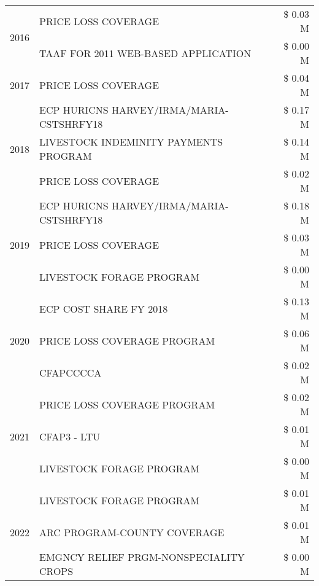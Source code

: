 \begin{tabular}{llr}
\multirow[t]{2}{*}{2016} & PRICE LOSS COVERAGE & \$ 0.03 M \\
 & TAAF FOR 2011 WEB-BASED APPLICATION & \$ 0.00 M \\
\cline{1-3}
2017 & PRICE LOSS COVERAGE & \$ 0.04 M \\
\cline{1-3}
\multirow[t]{3}{*}{2018} & ECP HURICNS HARVEY/IRMA/MARIA-CSTSHRFY18 & \$ 0.17 M \\
 & LIVESTOCK INDEMINITY PAYMENTS PROGRAM & \$ 0.14 M \\
 & PRICE LOSS COVERAGE & \$ 0.02 M \\
\cline{1-3}
\multirow[t]{3}{*}{2019} & ECP HURICNS HARVEY/IRMA/MARIA-CSTSHRFY18 & \$ 0.18 M \\
 & PRICE LOSS COVERAGE & \$ 0.03 M \\
 & LIVESTOCK FORAGE PROGRAM & \$ 0.00 M \\
\cline{1-3}
\multirow[t]{3}{*}{2020} & ECP COST SHARE FY 2018 & \$ 0.13 M \\
 & PRICE LOSS COVERAGE PROGRAM & \$ 0.06 M \\
 & CFAPCCCCA & \$ 0.02 M \\
\cline{1-3}
\multirow[t]{3}{*}{2021} & PRICE LOSS COVERAGE PROGRAM & \$ 0.02 M \\
 & CFAP3 - LTU & \$ 0.01 M \\
 & LIVESTOCK FORAGE PROGRAM & \$ 0.00 M \\
\cline{1-3}
\multirow[t]{3}{*}{2022} & LIVESTOCK FORAGE PROGRAM & \$ 0.01 M \\
 & ARC PROGRAM-COUNTY COVERAGE & \$ 0.01 M \\
 & EMGNCY RELIEF PRGM-NONSPECIALITY CROPS & \$ 0.00 M \\
\cline{1-3}
\bottomrule
\end{tabular}
